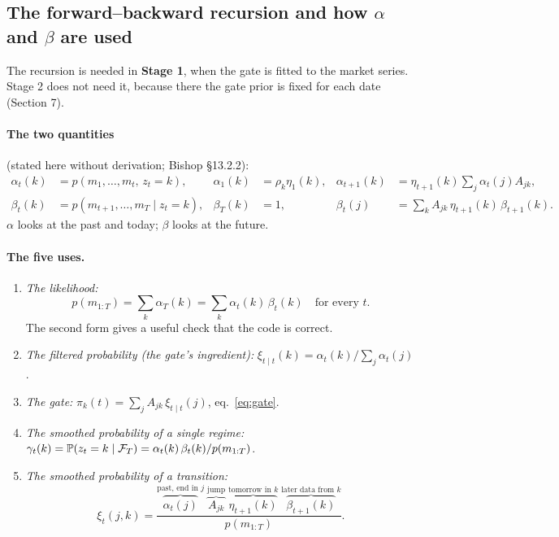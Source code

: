 \subsection{The forward--backward recursion and how $\alpha$ and $\beta$ are used}

The recursion is needed in \textbf{Stage 1}, when the gate is fitted to the market series. Stage 2 does not need it, because there the gate prior is fixed for each date (Section 7).

\paragraph{The two quantities} (stated here without derivation; Bishop \S13.2.2):
\begin{align}
\alpha_t(k)&=p(m_1,\dots,m_t,\,z_t=k), & \alpha_1(k)&=\rho_k\eta_1(k), & \alpha_{t+1}(k)&=\eta_{t+1}(k)\textstyle\sum_j\alpha_t(j)A_{jk},\\
\beta_t(k)&=p(m_{t+1},\dots,m_T\mid z_t=k), & \beta_T(k)&=1, & \beta_t(j)&=\textstyle\sum_kA_{jk}\,\eta_{t+1}(k)\,\beta_{t+1}(k).
\end{align}
$\alpha$ looks at the past and today; $\beta$ looks at the future.

\paragraph{The five uses.}
\begin{enumerate}
  \item \emph{The likelihood:}
  \begin{equation}
  p(m_{1:T})=\sum_k\alpha_T(k)=\sum_k\alpha_t(k)\,\beta_t(k)\quad\text{for every }t.
  \end{equation}
  The second form gives a useful check that the code is correct.
  \item \emph{The filtered probability (the gate's ingredient):} $\xi_{t\mid t}(k)=\alpha_t(k)/\sum_j\alpha_t(j)$.
  \item \emph{The gate:} $\pi_k(t)=\sum_jA_{jk}\,\xi_{t\mid t}(j)$, eq.~\eqref{eq:gate}.
  \item \emph{The smoothed probability of a single regime:} $\gamma_t(k)=\mathbb P(z_t=k\mid\mathcal{F}_T)=\alpha_t(k)\,\beta_t(k)/p(m_{1:T})$.
  \item \emph{The smoothed probability of a transition:}
  \begin{equation}
  \xi_t(j,k)=\frac{\overbrace{\alpha_t(j)}^{\text{past, end in }j}\;\overbrace{A_{jk}}^{\text{jump}}\;\overbrace{\eta_{t+1}(k)}^{\text{tomorrow in }k}\;\overbrace{\beta_{t+1}(k)}^{\text{later data from }k}}{p(m_{1:T})}.
  \end{equation}
\end{enumerate}

